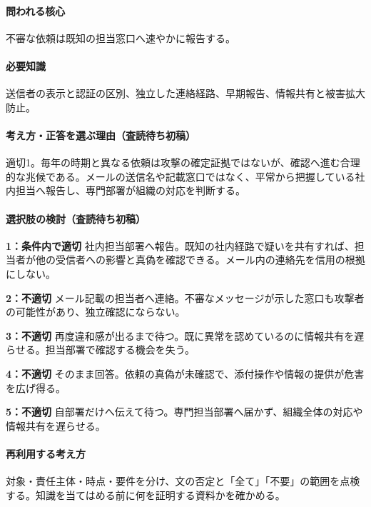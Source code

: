 \paragraph{問われる核心} 不審な依頼は既知の担当窓口へ速やかに報告する。

\paragraph{必要知識} 送信者の表示と認証の区別、独立した連絡経路、早期報告、情報共有と被害拡大防止。

\paragraph{考え方・正答を選ぶ理由（査読待ち初稿）} 適切1。毎年の時期と異なる依頼は攻撃の確定証拠ではないが、確認へ進む合理的な兆候である。メールの送信名や記載窓口ではなく、平常から把握している社内担当へ報告し、専門部署が組織の対応を判断する。

\paragraph{選択肢の検討（査読待ち初稿）}\mbox{}\par

\noindent\textbf{1：条件内で適切} 社内担当部署へ報告。既知の社内経路で疑いを共有すれば、担当者が他の受信者への影響と真偽を確認できる。メール内の連絡先を信用の根拠にしない。\par

\noindent\textbf{2：不適切} メール記載の担当者へ連絡。不審なメッセージが示した窓口も攻撃者の可能性があり、独立確認にならない。\par

\noindent\textbf{3：不適切} 再度違和感が出るまで待つ。既に異常を認めているのに情報共有を遅らせる。担当部署で確認する機会を失う。\par

\noindent\textbf{4：不適切} そのまま回答。依頼の真偽が未確認で、添付操作や情報の提供が危害を広げ得る。\par

\noindent\textbf{5：不適切} 自部署だけへ伝えて待つ。専門担当部署へ届かず、組織全体の対応や情報共有を遅らせる。\par

\paragraph{再利用する考え方} 対象・責任主体・時点・要件を分け、文の否定と「全て」「不要」の範囲を点検する。知識を当てはめる前に何を証明する資料かを確かめる。


